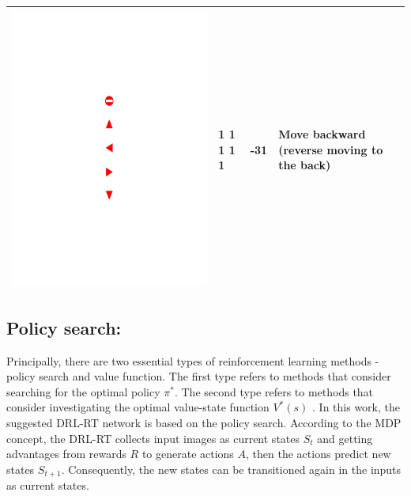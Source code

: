 \documentclass[a4paper,twoside]{article}
\begin{document}
\begin{table}[!h]
\begin{tabular}{|C{1.3cm}|C{1.3cm}|C{1.3cm}|C{2cm}|}
		\begin{minipage}{.075\textwidth}\includegraphics[scale=.5,trim=9.1cm 8.5cm 9.5cm 18cm,clip]{signs.pdf}\end{minipage} & 1 1 1 1 1 & -31 & Move backward (reverse moving to the back) \\ \hline
	\end{tabular}
\end{table}

\subsection{Policy search:} 
Principally, there are two essential types of reinforcement learning methods - policy search and value function. The first type refers to methods that consider searching for the optimal policy $\pi^*$. The second type refers to methods that consider investigating the optimal value-state function $V^*(s)$ \cite{Arulkumaran2017Deep}. In this work, the suggested DRL-RT network is based on the policy search. According to the MDP concept, the DRL-RT collects input images as current states $S_t$ and getting advantages from rewards $R$ to generate actions $A$, then the actions predict new states $S_{t+1}$. Consequently, the new states can be transitioned again in the inputs as current states. 
\end{document}
